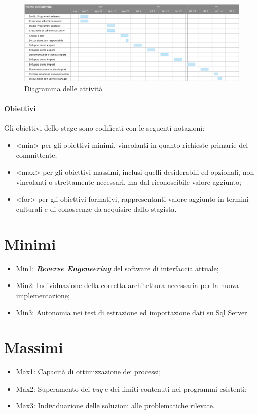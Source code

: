 \begin{figure}[!h]
\thispagestyle{empty}
\centering
\includegraphics[scale=0.85]{img/Gantt.png}
\caption{Diagramma delle attività}
\end{figure}
\newpage

\subsubsection{Obiettivi}
Gli obiettivi dello stage sono codificati con le seguenti notazioni:
\begin{itemize}
\item <min> per gli obiettivi minimi, vincolanti in quanto richieste primarie del committente;
\item <max> per gli obiettivi massimi, inclusi quelli desiderabili ed opzionali, non vincolanti o strettamente necessari, ma dal riconoscibile valore aggiunto;
\item <for> per gli obiettivi formativi, rappresentanti valore aggiunto in termini culturali e di conoscenze da acquisire dallo stagista.
\end{itemize}

\chapter{Minimi}
\begin{itemize}
\item Min1: \textit{\textbf{Reverse Engeneering}} del software di interfaccia attuale;
\item Min2: Individuazione della corretta architettura necessaria per la nuova implementazione;
\item Min3: Autonomia nei test di estrazione ed importazione dati su Sql Server.
\end{itemize}

\chapter{Massimi}
\begin{itemize}
\item Max1: Capacità di ottimizzazione dei processi;
\item Max2: Superamento dei \textit{bug} e dei limiti contenuti nei programmi esistenti;
\item Max3: Individuazione delle soluzioni alle problematiche rilevate.
\end{itemize}

